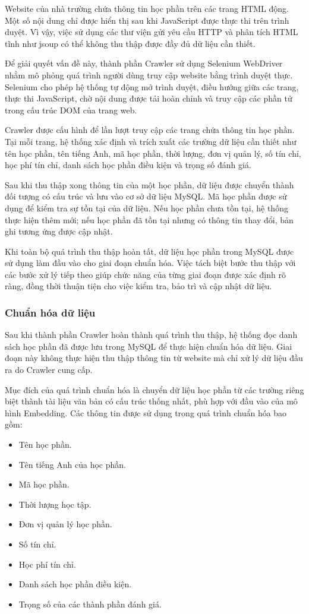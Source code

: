 \documentclass[../DoAn.tex]{subfiles}
\begin{document}
Website của nhà trường chứa thông tin học phần trên các trang HTML động. Một số nội dung chỉ được hiển thị sau khi JavaScript được thực thi trên trình duyệt. Vì vậy, việc sử dụng các thư viện gửi yêu cầu HTTP và phân tích HTML tĩnh như jsoup có thể không thu thập được đầy đủ dữ liệu cần thiết.

Để giải quyết vấn đề này, thành phần Crawler sử dụng Selenium WebDriver nhằm mô phỏng quá trình người dùng truy cập website bằng trình duyệt thực. Selenium cho phép hệ thống tự động mở trình duyệt, điều hướng giữa các trang, thực thi JavaScript, chờ nội dung được tải hoàn chỉnh và truy cập các phần tử trong cấu trúc DOM của trang web.

Crawler được cấu hình để lần lượt truy cập các trang chứa thông tin học phần. Tại mỗi trang, hệ thống xác định và trích xuất các trường dữ liệu cần thiết như tên học phần, tên tiếng Anh, mã học phần, thời lượng, đơn vị quản lý, số tín chỉ, học phí tín chỉ, danh sách học phần điều kiện và trọng số đánh giá.

Sau khi thu thập xong thông tin của một học phần, dữ liệu được chuyển thành đối tượng có cấu trúc và lưu vào cơ sở dữ liệu MySQL. Mã học phần được sử dụng để kiểm tra sự tồn tại của dữ liệu. Nếu học phần chưa tồn tại, hệ thống thực hiện thêm mới; nếu học phần đã tồn tại nhưng có thông tin thay đổi, bản ghi tương ứng được cập nhật.

Khi toàn bộ quá trình thu thập hoàn tất, dữ liệu học phần trong MySQL được sử dụng làm đầu vào cho giai đoạn chuẩn hóa. Việc tách biệt bước thu thập với các bước xử lý tiếp theo giúp chức năng của từng giai đoạn được xác định rõ ràng, đồng thời thuận tiện cho việc kiểm tra, bảo trì và cập nhật dữ liệu.

\subsubsection{Chuẩn hóa dữ liệu}

Sau khi thành phần Crawler hoàn thành quá trình thu thập, hệ thống đọc danh sách học phần đã được lưu trong MySQL để thực hiện chuẩn hóa dữ liệu. Giai đoạn này không thực hiện thu thập thông tin từ website mà chỉ xử lý dữ liệu đầu ra do Crawler cung cấp.

Mục đích của quá trình chuẩn hóa là chuyển dữ liệu học phần từ các trường riêng biệt thành tài liệu văn bản có cấu trúc thống nhất, phù hợp với đầu vào của mô hình Embedding. Các thông tin được sử dụng trong quá trình chuẩn hóa bao gồm:

\begin{itemize}
    \item Tên học phần.
    \item Tên tiếng Anh của học phần.
    \item Mã học phần.
    \item Thời lượng học tập.
    \item Đơn vị quản lý học phần.
    \item Số tín chỉ.
    \item Học phí tín chỉ.
    \item Danh sách học phần điều kiện.
    \item Trọng số của các thành phần đánh giá.
\end{itemize}
\end{document}
